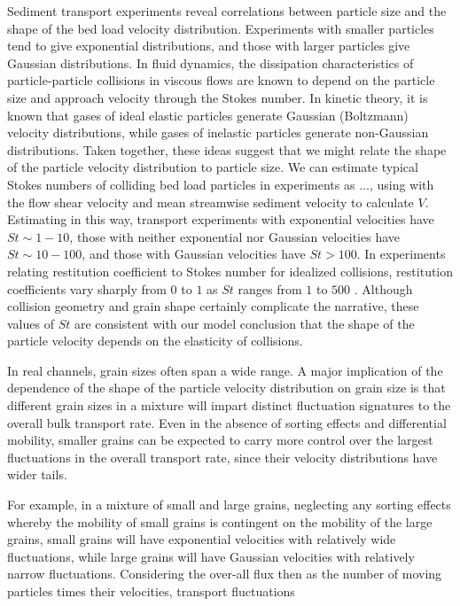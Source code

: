 Sediment transport experiments reveal correlations between particle size and the shape of the bed load velocity distribution.
Experiments with smaller particles tend to give exponential distributions, and those with larger particles give Gaussian distributions.
In fluid dynamics, the dissipation characteristics of particle-particle collisions in viscous flows are known to depend on the particle size and approach velocity through the Stokes number. 
In kinetic theory, it is known that gases of ideal elastic particles generate Gaussian (Boltzmann) velocity distributions, while gases of inelastic particles generate non-Gaussian distributions.
Taken together, these ideas suggest that we might relate the shape of the particle velocity distribution to particle size.
We can estimate typical Stokes numbers of colliding bed load particles in experiments as $...$, using with the flow shear velocity and mean streamwise sediment velocity to calculate $V$. Estimating in this way, transport experiments with exponential velocities have $St \sim 1-10$, those with neither exponential nor Gaussian velocities have $St \sim 10-100$, and those with Gaussian velocities have $St > 100$.
In experiments relating restitution coefficient to Stokes number for idealized collisions, restitution coefficients vary sharply from $0$ to $1$ as $St$ ranges from $1$ to $500$ \cite{Marshall2001,Joseph2001,Yang2006}.
Although collision geometry and grain shape certainly complicate the narrative, these values of $St$ are consistent with our model conclusion that the shape of the particle velocity depends on the elasticity of collisions.

In real channels, grain sizes often span a wide range. A major implication of the dependence of the shape of the particle velocity distribution on grain size is that different grain sizes in a mixture will impart distinct fluctuation signatures to the overall bulk transport rate. Even in the absence of sorting effects and differential mobility, smaller grains can be expected to carry more control over the largest fluctuations in the overall transport rate, since their velocity distributions have wider tails. 



For example, in a mixture of small and large grains, neglecting any sorting effects whereby the mobility of small grains is contingent on the mobility of the large grains, small grains will have exponential velocities with relatively wide fluctuations, while large grains will have Gaussian velocities with relatively narrow fluctuations. Considering the over-all flux then as the number of moving particles times their velocities, transport fluctuations



